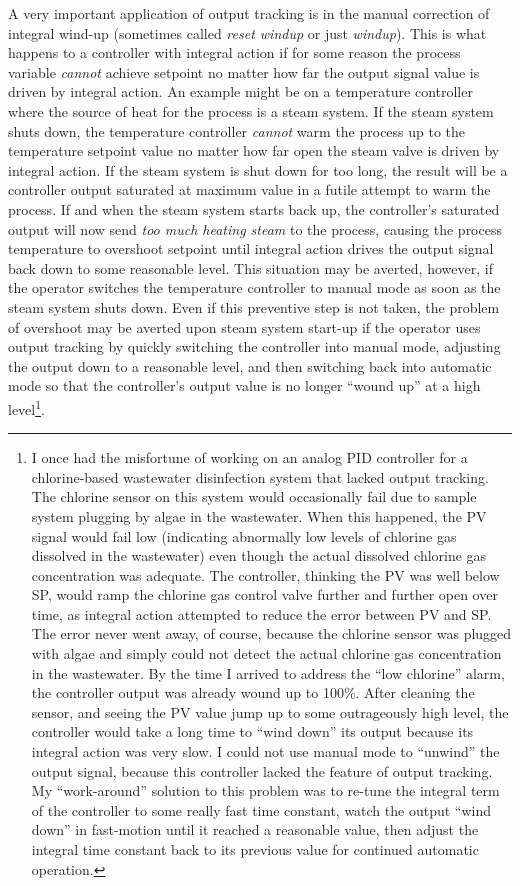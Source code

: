 A very important application of output tracking is in the manual correction of integral wind-up (sometimes called \textit{reset windup} or just \textit{windup}).  This is what happens to a controller with integral action if for some reason the process variable \textit{cannot} achieve setpoint no matter how far the output signal value is driven by integral action.  An example might be on a temperature controller where the source of heat for the process is a steam system.  If the steam system shuts down, the temperature controller \textit{cannot} warm the process up to the temperature setpoint value no matter how far open the steam valve is driven by integral action.  If the steam system is shut down for too long, the result will be a controller output saturated at maximum value in a futile attempt to warm the process.  If and when the steam system starts back up, the controller's saturated output will now send \textit{too much heating steam} to the process, causing the process temperature to overshoot setpoint until integral action drives the output signal back down to some reasonable level.  This situation may be averted, however, if the operator switches the temperature controller to manual mode as soon as the steam system shuts down.  Even if this preventive step is not taken, the problem of overshoot may be averted upon steam system start-up if the operator uses output tracking by quickly switching the controller into manual mode, adjusting the output down to a reasonable level, and then switching back into automatic mode so that the controller's output value is no longer ``wound up'' at a high level\footnote{I once had the misfortune of working on an analog PID controller for a chlorine-based wastewater disinfection system that lacked output tracking.  The chlorine sensor on this system would occasionally fail due to sample system plugging by algae in the wastewater.  When this happened, the PV signal would fail low (indicating abnormally low levels of chlorine gas dissolved in the wastewater) even though the actual dissolved chlorine gas concentration was adequate.  The controller, thinking the PV was well below SP, would ramp the chlorine gas control valve further and further open over time, as integral action attempted to reduce the error between PV and SP.  The error never went away, of course, because the chlorine sensor was plugged with algae and simply could not detect the actual chlorine gas concentration in the wastewater.  By the time I arrived to address the ``low chlorine'' alarm, the controller output was already wound up to 100\%.  After cleaning the sensor, and seeing the PV value jump up to some outrageously high level, the controller would take a long time to ``wind down'' its output because its integral action was very slow.  I could not use manual mode to ``unwind'' the output signal, because this controller lacked the feature of output tracking.  My ``work-around'' solution to this problem was to re-tune the integral term of the controller to some really fast time constant, watch the output ``wind down'' in fast-motion until it reached a reasonable value, then adjust the integral time constant back to its previous value for continued automatic operation.}.     

